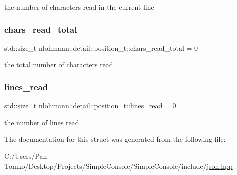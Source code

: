the number of characters read in the current line 

\mbox{\label{structnlohmann_1_1detail_1_1position__t_a94cf85cd91d478c20ae143eba906ea1a}} 
\subsubsection{\texorpdfstring{chars\_read\_total}{chars\_read\_total}}
{\footnotesize\ttfamily std\+::size\+\_\+t nlohmann\+::detail\+::position\+\_\+t\+::chars\+\_\+read\+\_\+total = 0}



the total number of characters read 

\mbox{\label{structnlohmann_1_1detail_1_1position__t_a4bbad8bc2c0d17c1b61c3ce729908b71}} 
\subsubsection{\texorpdfstring{lines\_read}{lines\_read}}
{\footnotesize\ttfamily std\+::size\+\_\+t nlohmann\+::detail\+::position\+\_\+t\+::lines\+\_\+read = 0}



the number of lines read 



The documentation for this struct was generated from the following file\+:\begin{DoxyCompactItemize}
\item 
C\+:/\+Users/\+Pan Tomko/\+Desktop/\+Projects/\+Simple\+Console/\+Simple\+Console/include/\mbox{\hyperlink{json_8hpp}{json.\+hpp}}\end{DoxyCompactItemize}
